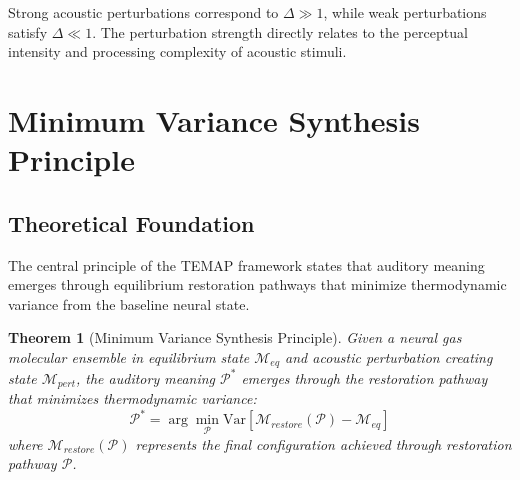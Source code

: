 \documentclass[12pt,a4paper]{article}
\newtheorem{theorem}{Theorem}[section]
\begin{document}
Strong acoustic perturbations correspond to $\Delta \gg 1$, while weak perturbations satisfy $\Delta \ll 1$. The perturbation strength directly relates to the perceptual intensity and processing complexity of acoustic stimuli.

\section{Minimum Variance Synthesis Principle}

\subsection{Theoretical Foundation}

The central principle of the TEMAP framework states that auditory meaning emerges through equilibrium restoration pathways that minimize thermodynamic variance from the baseline neural state.

\begin{theorem}[Minimum Variance Synthesis Principle]
Given a neural gas molecular ensemble in equilibrium state $\mathcal{M}_{eq}$ and acoustic perturbation creating state $\mathcal{M}_{pert}$, the auditory meaning $\mathcal{P}^*$ emerges through the restoration pathway that minimizes thermodynamic variance:
\begin{equation}
\mathcal{P}^* = \arg\min_{\mathcal{P}} \text{Var}\left[ \mathcal{M}_{restore}(\mathcal{P}) - \mathcal{M}_{eq} \right]
\end{equation}
where $\mathcal{M}_{restore}(\mathcal{P})$ represents the final configuration achieved through restoration pathway $\mathcal{P}$.
\end{theorem}
\end{document}
